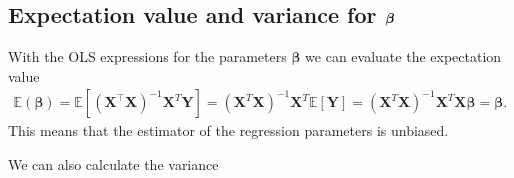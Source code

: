\documentclass[letterpaper,10pt,english]{sphinxmanual}
\begin{document}
\subsection{Expectation value and variance for \protect\(\boldsymbol{\beta}\protect\)}
\label{\detokenize{chapter4:expectation-value-and-variance-for-boldsymbol-beta}}
With the OLS expressions for the parameters \(\boldsymbol{\beta}\) we can evaluate the expectation value
\begin{equation*}
\begin{split}
\mathbb{E}(\boldsymbol{\beta}) = \mathbb{E}[ (\mathbf{X}^{\top} \mathbf{X})^{-1}\mathbf{X}^{T} \mathbf{Y}]=(\mathbf{X}^{T} \mathbf{X})^{-1}\mathbf{X}^{T} \mathbb{E}[ \mathbf{Y}]=(\mathbf{X}^{T} \mathbf{X})^{-1} \mathbf{X}^{T}\mathbf{X}\boldsymbol{\beta}=\boldsymbol{\beta}.
\end{split}
\end{equation*}
This means that the estimator of the regression parameters is unbiased.

We can also calculate the variance
\end{document}
